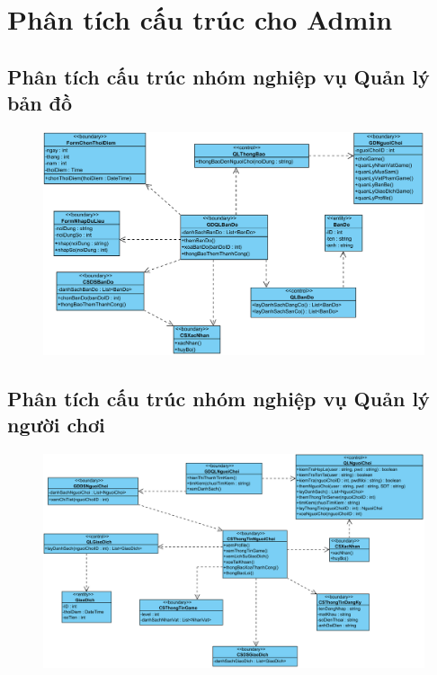 \documentclass[3p]{elsarticle}
\begin{document}
\section{Phân tích cấu trúc cho Admin}
\subsection{Phân tích cấu trúc nhóm nghiệp vụ Quản lý bản đồ}
\begin{figure}[!htbp]
	\hspace*{-.5in}
	\centering
	\includegraphics[scale=.55]{images/structure-pdfs/admin/qlBanDo.pdf}
\end{figure}
\newpage

\subsection{Phân tích cấu trúc nhóm nghiệp vụ Quản lý người chơi}
\begin{figure}[!htbp]
	\hspace*{-.5in}
	\centering
	\includegraphics[scale=.55]{images/structure-pdfs/admin/qlNguoiChoi.pdf}
\end{figure}
\newpage
\end{document}
